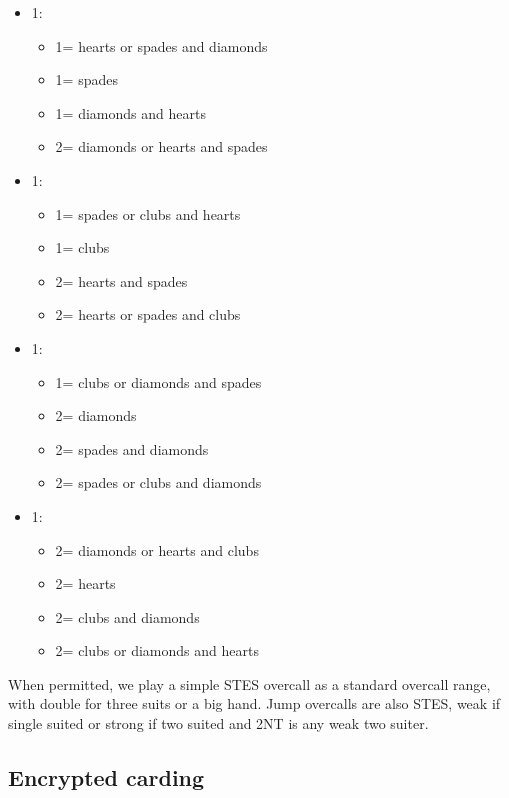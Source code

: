 \documentclass[a4paper,14pt]{extarticle}
\begin{document}
\begin{itemize}
\item 1\clubs:
	\begin{itemize}
	\item 1\diamonds = hearts or spades and diamonds
	\item 1\hearts = spades
	\item 1\spades = diamonds and hearts
	\item 2\clubs = diamonds or hearts and spades
	\end{itemize}
\item 1\diamonds:
	\begin{itemize}
	\item 1\hearts = spades or clubs and hearts
	\item 1\spades = clubs
	\item 2\clubs = hearts and spades
	\item 2\diamonds = hearts or spades and clubs
	\end{itemize}
\item 1\hearts:
	\begin{itemize}
	\item 1\spades = clubs or diamonds and spades
	\item 2\clubs = diamonds
	\item 2\diamonds = spades and diamonds
	\item 2\hearts = spades or clubs and diamonds
	\end{itemize}

\newpage

\item 1\spades:
	\begin{itemize}
	\item 2\clubs = diamonds or hearts and clubs
	\item 2\diamonds = hearts
	\item 2\hearts = clubs and diamonds
	\item 2\spades = clubs or diamonds and hearts
	\end{itemize}
\end{itemize}

When permitted, we play a simple STES overcall as a standard overcall range,
with double for three suits or a big hand. Jump overcalls are also STES, weak
if single suited or strong if two suited and 2NT is any weak two suiter.

\subsection{Encrypted carding}
\label{sec:carding:encrypted}
\end{document}
